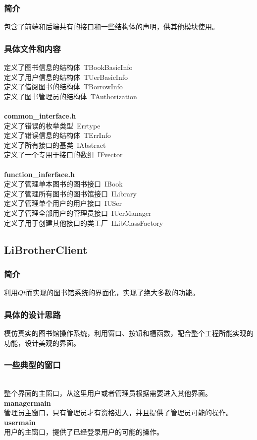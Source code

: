 \documentclass[UTF8]{ctexart}
\begin{document}
\subsubsection{简介}
包含了前端和后端共有的接口和一些结构体的声明，供其他模块使用。
\subsubsection{具体文件和内容}
定义了图书信息的结构体\ TBookBasicInfo\\
定义了用户信息的结构体\ TUerBasicInfo\\
定义了借阅图书的结构体\ TBorrowInfo\\
定义了图书管理员的结构体\ TAuthorization\\
\\
\textbf{common\_interface.h}\\
定义了错误的枚举类型\ Errtype\\
定义了错误信息的结构体\ TErrInfo\\
定义了所有接口的基类\ IAbstract\\
定义了一个专用于接口的数组\ IFvector\\
\\
\textbf{function\_inferface.h}\\
定义了管理单本图书的图书接口\ IBook\\
定义了管理所有图书的图书馆接口\ ILibrary\\
定义了管理单个用户的用户接口\ IUSer\\
定义了管理全部用户的管理员接口\ IUerManager\\
定义了用于创建其他接口的类工厂\ ILibClassFactory\\
\subsection{LiBrotherClient}
\subsubsection{简介}
利用$Qt$而实现的图书馆系统的界面化，实现了绝大多数的功能。\\
\subsubsection{具体的设计思路}
模仿真实的图书馆操作系统，利用窗口、按钮和槽函数，配合整个工程所能实现的功能，设计美观的界面。\\
\subsubsection{一些典型的窗口}
\\
整个界面的主窗口，从这里用户或者管理员根据需要进入其他界面。\\
\textbf{managermain}\\
管理员主窗口，只有管理员才有资格进入，并且提供了管理员可能的操作。\\
\textbf{usermain}\\
用户的主窗口，提供了已经登录用户的可能的操作。\\
\end{document}
